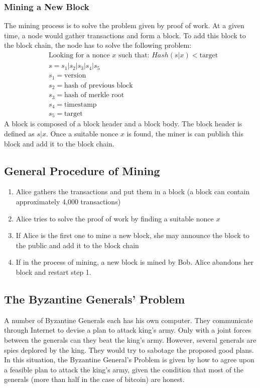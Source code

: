 \documentclass[12pt,a4paper]{article}
\begin{document}
\subsubsection{Mining a New Block}
The mining process is to solve the problem given by proof of work. At a given time, a node would gather transactions and form a block. To add this block to the block chain, the node has to solve the following problem:
\begin{align*}
&\text{Looking for a nonce $x$ such that: } Hash(s|x) < \text{target}\\
&s = s_1 | s_2 | s_3 | s_4 | s_5\\
&s_1 = \text{version}\\
&s_2 = \text{hash of previous block}\\
&s_3 = \text{hash of merkle root}\\
&s_4 = \text{timestamp }\\
&s_5 = \text{target}
\end{align*}
A block is composed of a block header and a block body. The block header is defined as $s|x$. Once a suitable nonce $x$ is found, the miner is can publish this block and add it to the block chain.
\subsection{General Procedure of Mining}
\begin{enumerate}
	\item Alice gathers the transactions and put them in a block (a block can contain approximately 4,000 transactions)
	\item Alice tries to solve the proof of work by finding a suitable nonce $x$
	\item If Alice is the first one to mine a new block, she may announce the block to the public and add it to the block chain
	\item If in the process of mining, a new block is mined by Bob. Alice abandons her block and restart step 1.
\end{enumerate}
\subsection{The Byzantine Generals' Problem}
A number of Byzantine Generals each has his own computer. They communicate through Internet to devise a plan to attack king's army. Only with a joint forces between the generals can they beat the king's army. However, several generals are spies deplored by the king. They would try to sabotage the proposed good plans. In this situation, the Byzantine General's Problem is given by how to agree upon a feasible plan to attack the king's army, given the condition that most of the generals (more than half in the case of bitcoin) are honest.
\end{document}
